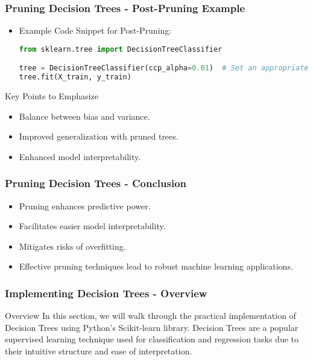 \documentclass[aspectratio=169]{beamer}
\begin{document}
\begin{frame}[fragile]
    \frametitle{Pruning Decision Trees - Post-Pruning Example}
    \begin{itemize}
        \item Example Code Snippet for Post-Pruning:
        \begin{lstlisting}[language=Python]
from sklearn.tree import DecisionTreeClassifier

tree = DecisionTreeClassifier(ccp_alpha=0.01)  # Set an appropriate alpha
tree.fit(X_train, y_train)
        \end{lstlisting}
    \end{itemize}
    \begin{block}{Key Points to Emphasize}
        \begin{itemize}
            \item Balance between bias and variance.
            \item Improved generalization with pruned trees.
            \item Enhanced model interpretability.
        \end{itemize}
    \end{block}
\end{frame}

\begin{frame}[fragile]
    \frametitle{Pruning Decision Trees - Conclusion}
    \begin{itemize}
        \item Pruning enhances predictive power.
        \item Facilitates easier model interpretability.
        \item Mitigates risks of overfitting.
        \item Effective pruning techniques lead to robust machine learning applications.
    \end{itemize}
\end{frame}

\begin{frame}[fragile]
    \frametitle{Implementing Decision Trees - Overview}
    \begin{block}{Overview}
        In this section, we will walk through the practical implementation of Decision Trees using Python's Scikit-learn library. 
        Decision Trees are a popular supervised learning technique used for classification and regression tasks due to their intuitive structure and ease of interpretation.
    \end{block}
\end{frame}
\end{document}
